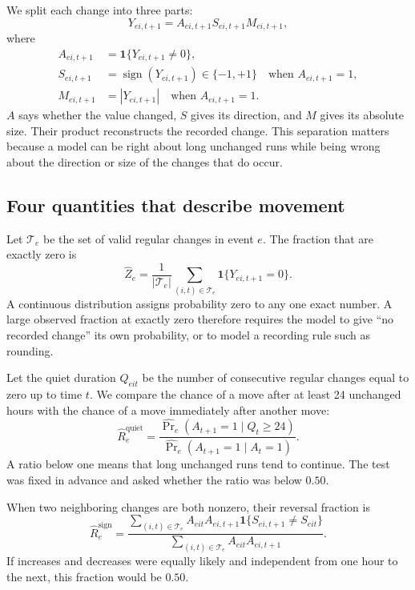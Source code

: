 \documentclass[10pt,twoside]{article}
\begin{document}
We split each change into three parts:
\begin{equation}
  Y_{e i,t+1}=A_{e i,t+1}S_{e i,t+1}M_{e i,t+1},
  \label{eq:asm-decomposition}
\end{equation}
where
\begin{align}
  A_{e i,t+1}&=\mathbf 1\{Y_{e i,t+1}\ne0\}, \\
  S_{e i,t+1}&=\operatorname{sign}(Y_{e i,t+1})\in\{-1,+1\}\quad\text{when }A_{e i,t+1}=1, \\
  M_{e i,t+1}&=|Y_{e i,t+1}|\quad\text{when }A_{e i,t+1}=1.
\end{align}
$A$ says whether the value changed, $S$ gives its direction, and $M$ gives its absolute size. Their product reconstructs the recorded change. This separation matters because a model can be right about long unchanged runs while being wrong about the direction or size of the changes that do occur.

\subsection{Four quantities that describe movement}

Let $\mathcal T_e$ be the set of valid regular changes in event $e$. The fraction that are exactly zero is
\begin{equation}
  \widehat Z_e
  =\frac{1}{|\mathcal T_e|}\sum_{(i,t)\in\mathcal T_e}\mathbf 1\{Y_{e i,t+1}=0\}.
  \label{eq:zero-share}
\end{equation}
A continuous distribution assigns probability zero to any one exact number. A large observed fraction at exactly zero therefore requires the model to give ``no recorded change'' its own probability, or to model a recording rule such as rounding.

Let the quiet duration $Q_{e i t}$ be the number of consecutive regular changes equal to zero up to time $t$. We compare the chance of a move after at least 24 unchanged hours with the chance of a move immediately after another move:
\begin{equation}
  \widehat R^{\mathrm{quiet}}_e
  =\frac{
    \widehat{\Pr}_e(A_{t+1}=1\mid Q_t\ge24)
  }{
    \widehat{\Pr}_e(A_{t+1}=1\mid A_t=1)
  }.
  \label{eq:quiet-ratio}
\end{equation}
A ratio below one means that long unchanged runs tend to continue. The test was fixed in advance and asked whether the ratio was below $0.50$.

When two neighboring changes are both nonzero, their reversal fraction is
\begin{equation}
  \widehat R^{\mathrm{sign}}_e
  =\frac{
  \sum_{(i,t)\in\mathcal T_e}
  A_{e i t}A_{e i,t+1}\mathbf 1\{S_{e i,t+1}\ne S_{e i t}\}
  }{
  \sum_{(i,t)\in\mathcal T_e}A_{e i t}A_{e i,t+1}
  }.
  \label{eq:reversal-share}
\end{equation}
If increases and decreases were equally likely and independent from one hour to the next, this fraction would be $0.50$.
\end{document}
